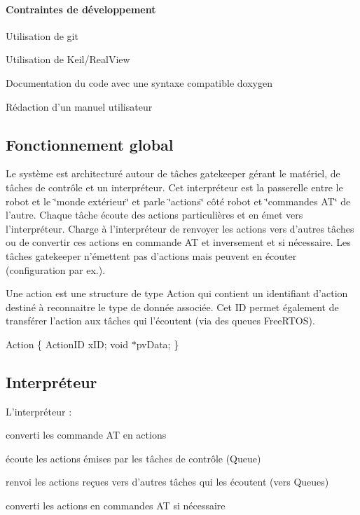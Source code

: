 \paragraph*{Contraintes de développement}


\begin{DoxyItemize}
\item Utilisation de git
\item Utilisation de Keil/\-Real\-View
\item Documentation du code avec une syntaxe compatible doxygen
\item Rédaction d'un manuel utilisateur
\end{DoxyItemize}

\subsection*{Fonctionnement global}

Le système est architecturé autour de tâches gatekeeper gérant le matériel, de tâches de contrôle et un interpréteur. Cet interpréteur est la passerelle entre le robot et le \char`\"{}monde extérieur\char`\"{} et parle \char`\"{}actions\char`\"{} côté robot et \char`\"{}commandes A\-T\char`\"{} de l'autre. Chaque tâche écoute des actions particulières et en émet vers l'interpréteur. Charge à l'interpréteur de renvoyer les actions vers d'autres tâches ou de convertir ces actions en commande A\-T et inversement et si nécessaire. Les tâches gatekeeper n'émettent pas d'actions mais peuvent en écouter (configuration par ex.).

Une action est une structure de type Action qui contient un identifiant d'action destiné à reconnaitre le type de donnée associée. Cet I\-D permet également de transférer l'action aux tâches qui l'écoutent (via des queues Free\-R\-T\-O\-S).

Action \{ Action\-I\-D x\-I\-D; void $\ast$pv\-Data; \}

\subsection*{Interpréteur}

L'interpréteur \-:
\begin{DoxyItemize}
\item converti les commande A\-T en actions
\item écoute les actions émises par les tâches de contrôle (Queue)
\item renvoi les actions reçues vers d'autres tâches qui les écoutent (vers Queues)
\item converti les actions en commandes A\-T si nécessaire
\end{DoxyItemize}

